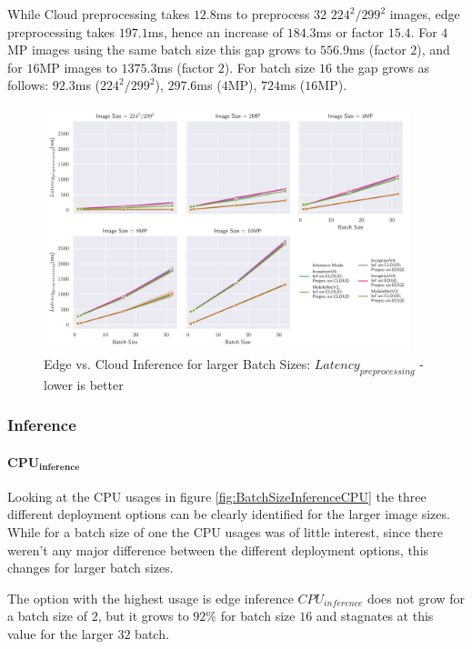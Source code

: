 While Cloud preprocessing takes $12.8$ms to preprocess $32$ $224^2/299^2$ images, edge preprocessing takes $197.1$ms, hence an increase of $184.3$ms or factor $15.4$. For $4$MP images using the same batch size this gap grows to $556.9$ms (factor $2$), and for $16$MP images to $1375.3$ms (factor $2$).
For batch size $16$ the gap grows as follows: $92.3$ms ($224^2/299^2$), $297.6$ms ($4$MP), $724$ms ($16$MP).


\begin{figure}[!htb]
\centering
\includegraphics[width=0.95\textwidth]{./Bilder/single_plots/batch_size_plots/Effects_of_Batch_size_Preprocessing_Latencies.pdf}
\caption{Edge vs. Cloud Inference for larger Batch Sizes:  $Latency_{preprocessing}$ - lower is better}
\label{fig:BatchSizePreproLatency}
\end{figure}



\FloatBarrier
\subsubsection{Inference}

\paragraph{$\mathbf{CPU_{inference}}$}
Looking at the CPU usages in figure \ref{fig:BatchSizeInferenceCPU} the three different deployment options can be clearly identified for the larger image sizes.
While for a batch size of one the CPU usages was of little interest, since there weren't any major difference between the different deployment options, this changes for larger batch sizes.

The option with the highest usage is edge inference $CPU_{inference}$ does not grow for a batch size of $2$, but it grows to $92\%$ for batch size $16$ and stagnates at this value for the larger $32$ batch.

